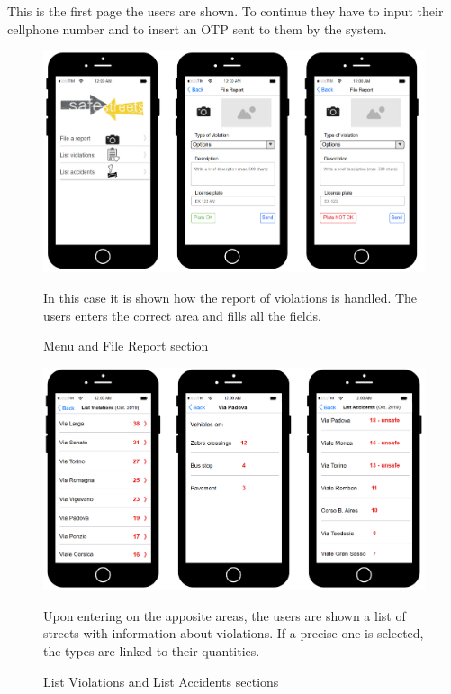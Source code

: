 This is the first page the users are shown. To continue they 
have to input their cellphone number and to insert an OTP 
sent to them by the system.
\newpage
\begin{figure} [H]
    \includegraphics[scale=0.47]{Images/Templates/User/us_3.PNG}
    \caption{\label{fig:Mockup-2}Menu and File Report section}
    In this case it is shown how the report of violations is 
    handled. The users enters the correct area and fills all 
    the fields.
\end{figure}


\begin{figure} [H]
    \includegraphics[scale=0.5]{Images/Templates/User/us_4.PNG}
    \caption{\label{fig:Mockup-3}List Violations and List 
    Accidents sections}
    Upon entering on the apposite areas, the users are shown 
    a list of streets with information about violations. If 
    a precise one is selected, the types are linked to their 
    quantities.
\end{figure}


